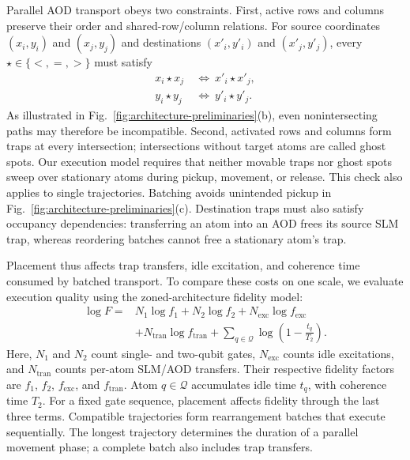 Parallel AOD transport obeys two constraints\cite{stade2024abstractmodel,stade2025routingaware}. First, active rows and columns preserve their order and shared-row/column relations. For source coordinates $(x_i,y_i)$ and $(x_j,y_j)$ and destinations $(x'_i,y'_i)$ and $(x'_j,y'_j)$, every \mbox{$\star\in\{<,=,>\}$} must satisfy
\begin{equation}
\begin{aligned}
x_i\star x_j&\ \Longleftrightarrow\ x'_i\star x'_j,\\
y_i\star y_j&\ \Longleftrightarrow\ y'_i\star y'_j.
\end{aligned}
\label{eq:aod-relations}
\end{equation}
As illustrated in Fig.~\ref{fig:architecture-preliminaries}(b), even nonintersecting paths may therefore be incompatible. Second, activated rows and columns form traps at every intersection; intersections without target atoms are called ghost spots. Our execution model requires that neither movable traps nor ghost spots sweep over stationary atoms during pickup, movement, or release. This check also applies to single trajectories. Batching avoids unintended pickup in Fig.~\ref{fig:architecture-preliminaries}(c). Destination traps must also satisfy occupancy dependencies: transferring an atom into an AOD frees its source SLM trap\cite{lin2025zac}, whereas reordering batches cannot free a stationary atom's trap.

Placement thus affects trap transfers, idle excitation, and coherence time consumed by batched transport. To compare these costs on one scale, we evaluate execution quality using the zoned-architecture fidelity model\cite{lin2025zac}:
\begin{equation}
\begin{aligned}
\log F={}&N_1\log f_1+N_2\log f_2
+N_{\mathrm{exc}}\log f_{\mathrm{exc}}\\
&+N_{\mathrm{tran}}\log f_{\mathrm{tran}}
+\sum_{q\in\mathcal Q}\log\left(1-\frac{t_q}{T_2}\right).
\end{aligned}
\label{eq:fidelity}
\end{equation}
Here, $N_1$ and $N_2$ count single- and two-qubit gates, $N_{\mathrm{exc}}$ counts idle excitations, and $N_{\mathrm{tran}}$ counts per-atom SLM/AOD transfers. Their respective fidelity factors are $f_1$, $f_2$, $f_{\mathrm{exc}}$, and $f_{\mathrm{tran}}$. Atom $q\in\mathcal Q$ accumulates idle time $t_q$, with coherence time $T_2$. For a fixed gate sequence, placement affects fidelity through the last three terms. Compatible trajectories form rearrangement batches that execute sequentially. The longest trajectory determines the duration of a parallel movement phase\cite{stade2025routingaware}; a complete batch also includes trap transfers\cite{lin2025zac}.

